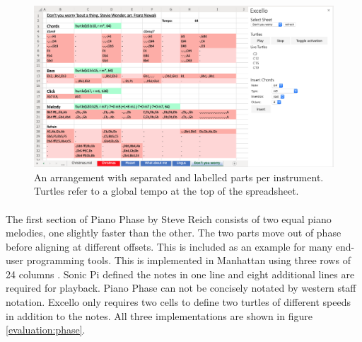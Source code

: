 \begin{figure}[tbh]
\centerline{\includegraphics[width=150mm]{figs/excelloFranz.png}}
\caption{An arrangement with separated and labelled parts per instrument. Turtles refer to a global tempo at the top of the spreadsheet.}
\label{evaluation:excelloFranz}
\end{figure}

\paragraph{} The first section of Piano Phase by Steve Reich consists of two equal piano melodies, one slightly faster than the other. The two parts move out of phase before aligning at different offsets. This is included as an example for many end-user programming tools. This is implemented in Manhattan using three rows of 24 columns \cite{nash:manhattan}. Sonic Pi defined the notes in one line and eight additional lines are required for playback. Piano Phase can not be concisely notated by western staff notation. Excello only requires two cells to define two turtles of different speeds in addition to the notes. All three implementations are shown in figure \ref{evaluation:phase}.



